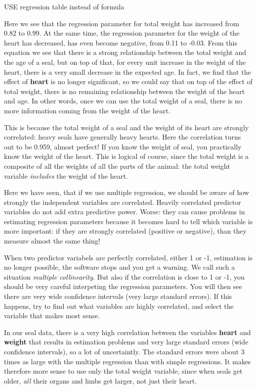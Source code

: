 \documentclass[]{report}\usepackage[]{graphicx}\usepackage[]{color}
\begin{document}
USE regression table instead of formula


Here we see that the regression parameter for total weight has increased from 0.82 to 0.99. At the same time, the regression parameter for the weight of the heart has decreased, has even become negative, from 0.11 to -0.03. From this equation we see that there is a strong relationship between the total weight and the age of a seal, but on top of that, for every unit increase in the weight of the heart, there is a very small decrease in the expected age. In fact, we find that the effect of \textbf{heart} is no longer significant, so we could say that on top of the effect of total weight, there is no remaining relationship between the weight of the heart and age. In other words, once we can use the total weight of a seal, there is no more information coming from the weight of the heart.

This is because the total weight of a seal and the weight of its heart are strongly correlated: heavy seals have generally heavy hearts. Here the correlation turns out to be 0.959, almost perfect! If you know the weight of seal, you practically know the weight of the heart. This is logical of course, since the total weight is a composite of all the weights of all the parts of the animal: the total weight variable \textit{includes} the weight of the heart.

Here we have seen, that if we use multiple regression, we should be aware of how strongly the independent variables are correlated. Heavily correlated predictor variables do not add extra predictive power. Worse: they can cause problems in estimating regression parameters because it becomes hard to tell which variable is more important: if they are strongly correlated (positive or negative), than they measure almost the same thing!

When two predictor variabels are perfectly correlated, either 1 or -1, estimation is no longer possible, the software stops and you get a warning. We call such a situation \textit{multiple collinearity}. But also if the correlation is close to 1 or -1, you should be very careful interpeting the regression parameters. You will then see there are very wide confidence intervals (very large standard errors). If this happens, try to find out what variables are highly correlated, and select the variable that makes most sense.

In our seal data, there is a very high correlation between the variables \textbf{heart} and \textbf{weight} that results in estimation problems and very large standard errors (wide confidence intervals), so a lot of uncertaintly. The standard errors were about 3 times as large with the multiple regression than with simple regressions. It makes therefore more sense to use only the total weight variable, since when seals get older, \textit{all} their organs and limbs get larger, not just their heart.
\end{document}
